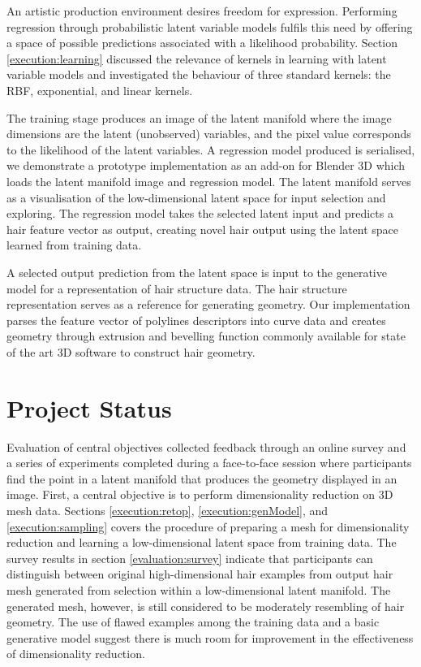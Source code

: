 \documentclass[ %
author={Dillon Keith Diep},
supervisor={Dr. Carl Henrik Ek},
degree={MEng},
title={ART-CG Hair:},
subtitle={Assisted Real-time Content Generation of Stylised Virtual Hair},
type={Research},
year={2017} ]{dissertation}
\begin{document}
An artistic production environment desires freedom for expression. Performing regression through probabilistic latent variable models fulfils this need by offering a space of possible predictions associated with a likelihood probability.
Section \ref{execution:learning} discussed the relevance of kernels in learning with latent variable models and investigated the behaviour of three standard kernels: the RBF, exponential, and linear kernels.

The training stage produces an image of the latent manifold where the image dimensions are the latent (unobserved) variables, and the pixel value corresponds to the likelihood of the latent variables.
A regression model produced is serialised, we demonstrate a prototype implementation as an add-on for Blender 3D which loads the latent manifold image and regression model. The latent manifold serves as a visualisation of the low-dimensional latent space for input selection and exploring. The regression model takes the selected latent input and predicts a hair feature vector as output, creating novel hair output using the latent space learned from training data.

A selected output prediction from the latent space is input to the generative model for a representation of hair structure data. 
The hair structure representation serves as a reference for generating geometry.
Our implementation parses the feature vector of polylines descriptors into curve data and creates geometry through extrusion and bevelling function commonly available for state of the art 3D software to construct hair geometry.

\section{Project Status}
Evaluation of central objectives collected feedback through an online survey and a series of experiments completed during a face-to-face session where participants find the point in a latent manifold that produces the geometry displayed in an image.
First, a central objective is to perform dimensionality reduction on 3D mesh data.
Sections \ref{execution:retop}, \ref{execution:genModel}, and \ref{execution:sampling} covers the procedure of preparing a mesh for dimensionality reduction and learning a low-dimensional latent space from training data.
The survey results in section \ref{evaluation:survey} indicate that participants can distinguish between original high-dimensional hair examples from output hair mesh generated from selection within a low-dimensional latent manifold. The generated mesh, however, is still considered to be moderately resembling of hair geometry. The use of flawed examples among the training data and a basic generative model suggest there is much room for improvement in the effectiveness of dimensionality reduction.
\end{document}
